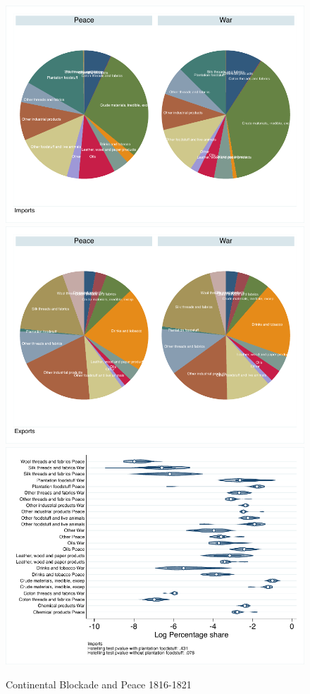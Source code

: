 \documentclass[12pt,a4paper,notitlepage,english]{article}
\begin{document}
\begin{figure}
\centering
\caption{Continental Blockade and Peace 1816-1821}
\label{post_blockade}
\includegraphics[scale=.63]{post_blockade_composition_I}
\includegraphics[scale=.63]{post_blockade_composition_X}
\vspace{0.7cm}
\includegraphics[scale=.63]{post_blockade_distribution_I}

\end{figure}
\end{document}
